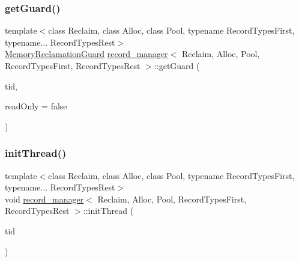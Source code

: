 \subsubsection{\texorpdfstring{get\+Guard()}{getGuard()}}
{\footnotesize\ttfamily template$<$class Reclaim, class Alloc, class Pool, typename Record\+Types\+First, typename... Record\+Types\+Rest$>$ \\
\hyperlink{classrecord__manager_1_1MemoryReclamationGuard}{Memory\+Reclamation\+Guard} \hyperlink{classrecord__manager}{record\+\_\+manager}$<$ Reclaim, Alloc, Pool, Record\+Types\+First, Record\+Types\+Rest $>$\+::get\+Guard (\begin{DoxyParamCaption}\item[{const int}]{tid,  }\item[{const bool}]{read\+Only = {\ttfamily false} }\end{DoxyParamCaption})\hspace{0.3cm}{\ttfamily [inline]}}

\mbox{\label{classrecord__manager_ab577f40a0f82ddff6b42dcd77e53e4ab}} 
\subsubsection{\texorpdfstring{init\+Thread()}{initThread()}}
{\footnotesize\ttfamily template$<$class Reclaim, class Alloc, class Pool, typename Record\+Types\+First, typename... Record\+Types\+Rest$>$ \\
void \hyperlink{classrecord__manager}{record\+\_\+manager}$<$ Reclaim, Alloc, Pool, Record\+Types\+First, Record\+Types\+Rest $>$\+::init\+Thread (\begin{DoxyParamCaption}\item[{const int}]{tid }\end{DoxyParamCaption})\hspace{0.3cm}{\ttfamily [inline]}}

\mbox{\label{classrecord__manager_a411492c56b7263d775f078c6a9924122}} 
